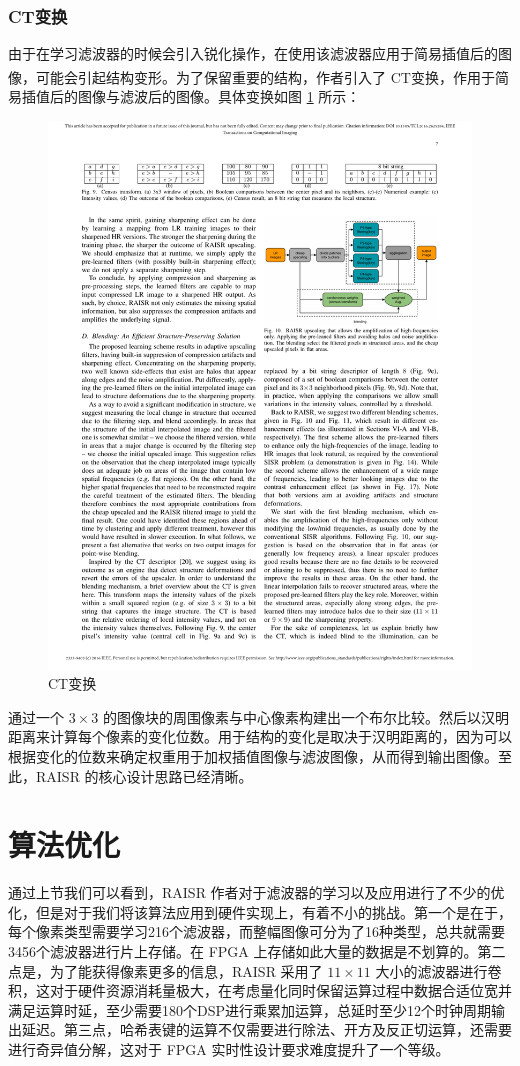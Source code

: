 \documentclass[12pt, a4paper, oneside]{ctexbook}
\begin{document}
	\subsection{CT变换}
	由于在学习滤波器的时候会引入锐化操作，在使用该滤波器应用于简易插值后的图像，可能会引起结构变形。为了保留重要的结构，作者引入了 CT变换\textsuperscript{\cite{7}}，作用于简易插值后的图像与滤波后的图像。具体变换如图 \ref{CT_tran} 所示：
		\begin{figure}[h]
		\centering
		\includegraphics[scale=0.88]{./pic/CT.pdf}
		\caption{CT变换}
		\label{CT_tran}
		\end{figure}
	通过一个 $3\times 3$ 的图像块的周围像素与中心像素构建出一个布尔比较。然后以汉明距离来计算每个像素的变化位数。用于结构的变化是取决于汉明距离的，因为可以根据变化的位数来确定权重用于加权插值图像与滤波图像，从而得到输出图像。至此，RAISR 的核心设计思路已经清晰。
	
	\chapter{算法优化}
	通过上节我们可以看到，RAISR 作者对于滤波器的学习以及应用进行了不少的优化，但是对于我们将该算法应用到硬件实现上，有着不小的挑战。第一个是在于，每个像素类型需要学习216个滤波器，而整幅图像可分为了16种类型，总共就需要3456个滤波器进行片上存储。在 FPGA 上存储如此大量的数据是不划算的。第二点是，为了能获得像素更多的信息，RAISR 采用了 $11\times11$ 大小的滤波器进行卷积，这对于硬件资源消耗量极大，在考虑量化同时保留运算过程中数据合适位宽并满足运算时延，至少需要180个DSP进行乘累加运算，总延时至少12个时钟周期输出延迟。第三点，哈希表键的运算不仅需要进行除法、开方及反正切运算，还需要进行奇异值分解，这对于 FPGA 实时性设计要求难度提升了一个等级。
\end{document}
